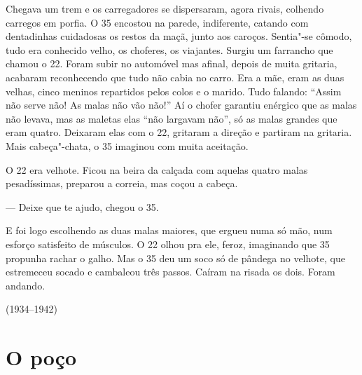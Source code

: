 \begin{linenumbers}
Chegava um trem e os carregadores se dispersaram, agora rivais, colhendo
carregos em porfia. O 35 encostou na parede, indiferente, catando com
dentadinhas cuidadosas os restos da maçã, junto aos caroços. Sentia"-se
cômodo, tudo era conhecido velho, os choferes, os viajantes. Surgiu um
farrancho que chamou o 22. Foram subir no automóvel mas afinal, depois
de muita gritaria, acabaram reconhecendo que tudo não cabia no carro.
Era a mãe, eram as duas velhas, cinco meninos repartidos pelos colos e o
marido. Tudo falando: ``Assim não serve não! As malas não vão não!'' Aí
o chofer garantiu enérgico que as malas não levava, mas as maletas elas
``não largavam não'', só as malas grandes que eram quatro. Deixaram elas
com o 22, gritaram a direção e partiram na gritaria. Mais cabeça"-chata,
o 35 imaginou com muita aceitação.

O 22 era velhote. Ficou na beira da calçada com aquelas quatro malas
pesadíssimas, preparou a correia, mas coçou a cabeça.

--- Deixe que te ajudo, chegou o 35.

E foi logo escolhendo as duas malas maiores, que ergueu numa só mão, num
esforço satisfeito de músculos. O 22 olhou pra ele, feroz, imaginando
que 35 propunha rachar o galho. Mas o 35 deu um soco só de pândega no
velhote, que estremeceu socado e cambaleou três passos. Caíram na risada
os dois. Foram andando.

\bigskip

\hfill{}(1934--1942)
\end{linenumbers}

\chapter{O poço}

